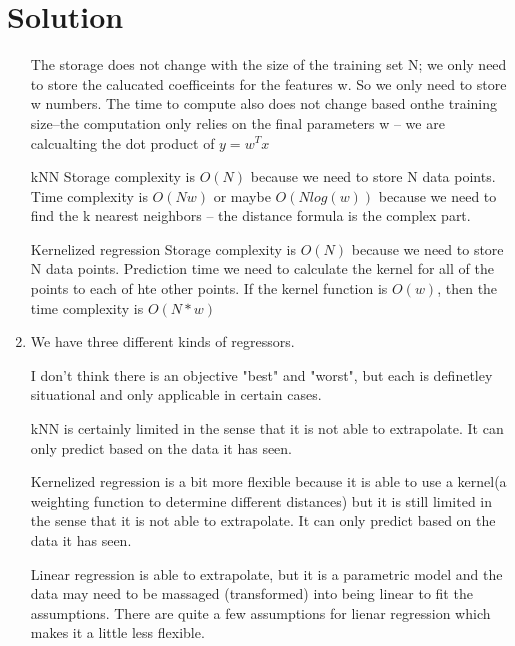 \documentclass[submit]{../harvardml}
\newenvironment{solution}
  {\color{blue}\section*{Solution}}
{}
\begin{document}
\begin{solution}
\begin{tcolorbox}[title=Solution,colback=white,colframe=black,breakable]
\begin{enumerate}
    The storage does not change with the size of the training set N; we only need to store the calucated coefficeints for the features w. So we only need to store w numbers.  \newline
    The time to compute also does not change based onthe training size--the computation only relies on the final parameters w -- we are calcualting the dot product of $ y = w^Tx$ \newline

    kNN \newline
    Storage complexity is $O(N)$ because we need to store N data points. \newline
    Time complexity is $O(Nw)$ or maybe $O(N log(w))$ because we need to find the k nearest neighbors -- the distance formula is the complex part. \newline


    Kernelized regression \newline
    Storage complexity is $O(N)$ because we need to store N data points. \newline
    Prediction time we need to calculate the kernel for all of the points to each of hte other points. If the kernel function is $O(w)$, then the time complexity is $O(N*w)$ \newline

    \item 
    We have three different kinds of regressors. \newline

    I don't think there is an objective "best" and "worst", but each is definetley situational and only applicable in certain cases. \newline

    kNN is certainly limited in the sense that it is not able to extrapolate. It can only predict based on the data it has seen. \newline

    Kernelized regression is a bit more flexible because it is able to use a kernel(a weighting function to determine different distances) but it is still limited in the sense that it is not able to extrapolate. It can only predict based on the data it has seen. \newline

    Linear regression is able to extrapolate, but it is a parametric model and the data may need to be massaged (transformed) into being linear to fit the assumptions. There are quite a few assumptions for lienar regression which makes it a little less flexible. 



    \end{enumerate}

  \end{tcolorbox}





\end{solution}
\end{document}
